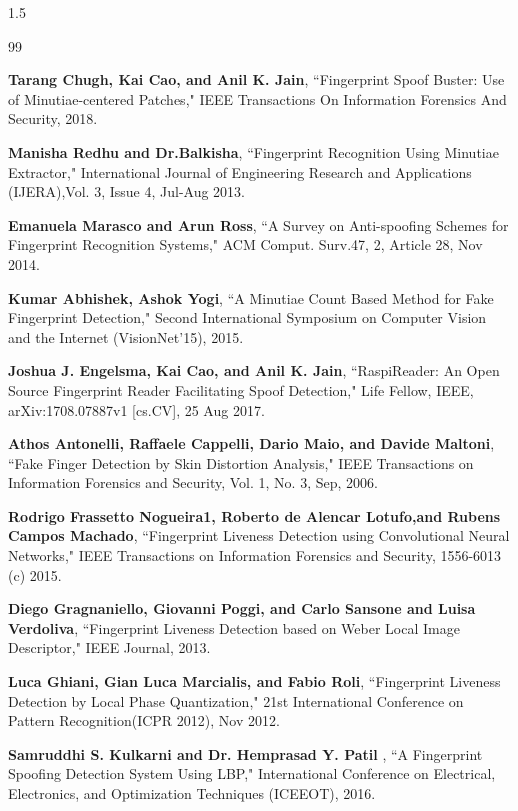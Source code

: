 \renewcommand{\bibname}{REFERENCES}
\cleardoublepage %
\begin{spacing}{1.5}
\begin{thebibliography}{99}

 \textbf{Tarang Chugh, Kai Cao, and Anil K. Jain}, ``Fingerprint Spoof Buster: Use of Minutiae-centered Patches," IEEE Transactions On Information Forensics And Security, 2018.  

 \textbf{Manisha Redhu and Dr.Balkisha}, ``Fingerprint Recognition Using Minutiae Extractor,"   International Journal of Engineering Research and  Applications (IJERA),Vol. 3, Issue 4, Jul-Aug 2013.

 \textbf{Emanuela Marasco and Arun Ross}, ``A Survey on Anti-spoofing Schemes for Fingerprint Recognition Systems,"  ACM Comput. Surv.47, 2, Article 28, Nov 2014.

 \textbf{Kumar Abhishek, Ashok Yogi}, ``A Minutiae Count Based Method for Fake Fingerprint Detection,"  Second International Symposium on Computer Vision and the Internet (VisionNet’15), 2015.

 \textbf{Joshua J. Engelsma, Kai Cao, and Anil K. Jain}, ``RaspiReader: An Open Source Fingerprint Reader Facilitating Spoof Detection,"  Life Fellow, IEEE, arXiv:1708.07887v1 [cs.CV], 25 Aug 2017.

 \textbf{Athos Antonelli, Raffaele Cappelli, Dario Maio, and Davide Maltoni}, ``Fake Finger Detection by Skin Distortion Analysis," IEEE Transactions on Information Forensics and Security, Vol. 1, No. 3, Sep, 2006.

 \textbf{Rodrigo Frassetto Nogueira1, Roberto de Alencar Lotufo,and Rubens Campos Machado}, ``Fingerprint Liveness Detection using Convolutional Neural Networks," IEEE Transactions on Information Forensics and Security, 1556-6013 (c) 2015.

 \textbf{Diego Gragnaniello, Giovanni Poggi, and Carlo Sansone and Luisa Verdoliva}, ``Fingerprint Liveness Detection based on Weber Local Image Descriptor," IEEE Journal, 2013.

 \textbf{Luca Ghiani, Gian Luca Marcialis, and Fabio Roli}, ``Fingerprint Liveness Detection by Local Phase Quantization,"  21st International Conference on Pattern Recognition(ICPR 2012), Nov 2012. 

 \textbf{Samruddhi S. Kulkarni and Dr. Hemprasad Y. Patil }, ``A Fingerprint Spoofing Detection System Using LBP," International Conference on Electrical, Electronics, and Optimization Techniques (ICEEOT), 2016.


\end{thebibliography}
\end{spacing}
